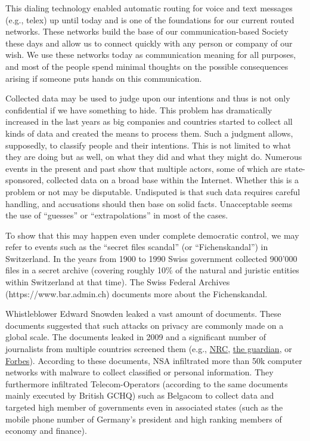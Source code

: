 \documentclass[10pt,journal,compsoc]{IEEEtran}
\begin{document}
This dialing technology enabled automatic routing for voice and text messages (e.g., telex) up until today and is one of the foundations for our current routed networks. These networks build the base of our communication-based Society these days and allow us to connect quickly with any person or company of our wish. We use these networks today as communication meaning for all purposes, and most of the people spend minimal thoughts on the possible consequences arising if someone puts hands on this communication. 

Collected data may be used to judge upon our intentions and thus is not only confidential if we have something to hide. This problem has dramatically increased in the last years as big companies and countries started to collect all kinds of data and created the means to process them. Such a judgment allows, supposedly, to classify people and their intentions. This is not limited to what they are doing but as well, on what they did and what they might do. Numerous events in the present and past show that multiple actors, some of which are state-sponsored, collected data on a broad base within the Internet. Whether this is a problem or not may be disputable. Undisputed is that such data requires careful handling, and accusations should then base on solid facts. Unacceptable seems the use of ``guesses'' or ``extrapolations'' in most of the cases.

To show that this may happen even under complete democratic control, we may refer to events such as the ``secret files scandal'' (or  ``Fichenskandal'') in Switzerland. In the years from 1900 to 1990 Swiss government collected 900’000 files in a secret archive (covering roughly 10\% of the natural and juristic entities within Switzerland at that time). The Swiss Federal Archives (https://www.bar.admin.ch) documents more about the Fichenskandal.

Whistleblower Edward Snowden leaked a vast amount of documents. These documents suggested that such attacks on privacy are commonly made on a global scale. The documents leaked in 2009 and a significant number of journalists from multiple countries screened them (e.g., \href{http://www.nrc.nl/nieuws/2013/11/23/nederland-sinds-1946-doelwit-van-nsa}{NRC}, \href{https://www.theguardian.com/world/2013/jun/08/nsa-prism-server-collection-facebook-google}{the guardian}, or \href{https://www.forbes.com/sites/andygreenberg/2013/06/20/leaked-nsa-doc-says-it-can-collect-and-keep-your-encrypted-data-as-long-as-it-takes-to-crack-it/#6de23d75b07d}{Forbes}). According to these documents, NSA infiltrated more than 50k computer networks with malware to collect classified or personal information. They furthermore infiltrated Telecom-Operators (according to the same documents mainly executed by British GCHQ) such as Belgacom to collect data and targeted high member of governments even in associated states (such as the mobile phone number of Germany's president and high ranking members of economy and finance).
\end{document}
